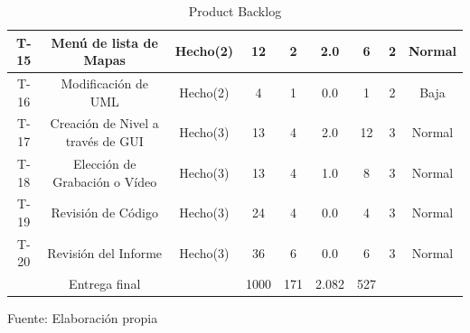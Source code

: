 \begin{landscape}
\begin{table}[t]
\begin{center}
\begin{tabular}{| c | c | c | c | c | c | c | c | c |}
				T-15 & Menú de lista de Mapas & Hecho(2) & 12 & 2 & 2.0 & 6 & 2 & Normal \\ \hline
				T-16 & Modificación de UML & Hecho(2) & 4 & 1 & 0.0 & 1 & 2 & Baja \\ \hline
				T-17 & Creación de Nivel a través de GUI & Hecho(3) & 13 & 4 & 2.0 & 12 & 3 & Normal \\ \hline
				T-18 & Elección de Grabación o Vídeo & Hecho(3) & 13 & 4 & 1.0 & 8 & 3 & Normal \\ \hline
				T-19 & Revisión de Código & Hecho(3) & 24 & 4 & 0.0 & 4 & 3 & Normal \\ \hline
				T-20 & Revisión del Informe & Hecho(3) & 36 & 6 & 0.0 & 6 & 3 & Normal \\ \hline
				& Entrega final & & 1000 & 171 & 2.082 & 527 &  &  \\ \hline
			\end{tabular}
			\caption{Product Backlog}
			\label{productbacklog}
			\footnotesize Fuente: Elaboración propia
		\end{center}
	\end{table}
\end{landscape}
\restoregeometry


\clearpage
